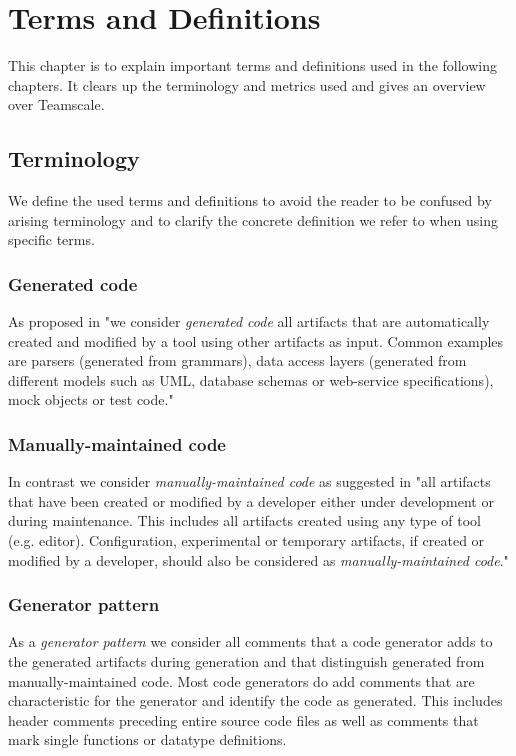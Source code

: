 
\chapter{Terms and Definitions}\label{chapter:terms}
This chapter is to explain important terms and definitions used in the following chapters. It clears up the terminology and metrics used and gives an overview over Teamscale.
\section{Terminology}
We define the used terms and definitions to avoid the reader to be confused by arising terminology and to clarify the concrete definition we refer to when using specific terms.
\subsection{Generated code}
As proposed in \cite{Alves2011} "we consider \textit{generated code} all artifacts that are automatically created and modified by a tool using other artifacts as input. Common examples are parsers (generated from grammars), data access layers (generated from different models such as UML, database schemas or web-service specifications), mock objects or test code."\mbox{\cite[p.~11]{Alves2011}}

\subsection{Manually-maintained code}
In contrast we consider \textit{manually-maintained code} as suggested in \cite{Alves2011} "all artifacts that have been created or modified by a developer either under development or during maintenance. This includes all artifacts created using any type of tool (e.g. editor). Configuration, experimental or temporary artifacts, if created or modified by a developer, should also be considered as \textit{manually-maintained code}."\mbox{\cite[p.~11]{Alves2011}}

\subsection{Generator pattern}
As a \textit{generator pattern} we consider all comments that a code generator adds to the generated artifacts during generation and that distinguish generated from manually-maintained code. Most code generators do add comments that are characteristic for the generator and identify the code as generated. This includes header comments preceding entire source code files as well as comments that mark single functions or datatype definitions.


